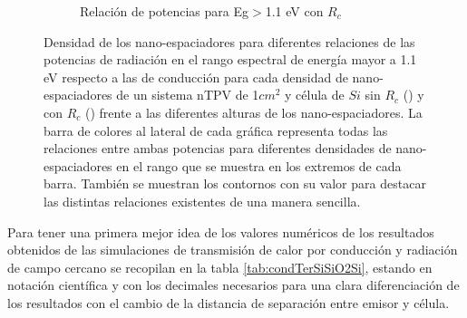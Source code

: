 \begin{figure}[H]
\begin{subfigure}[b]{0.49\textwidth}
	\caption{Relación de potencias para Eg$>$1.1 eV con $R_c$}
	\label{fig:rel_SiSi11_Rc}
\end{subfigure}
\caption{Densidad de los nano-espaciadores para diferentes relaciones de las potencias de radiación en el rango espectral de energía mayor a 1.1 eV respecto a las de conducción para cada densidad de nano-espaciadores de un sistema nTPV de 1$cm^2$ y célula de $Si$ sin $R_c$ () y con $R_c$ () frente a las diferentes alturas de los nano-espaciadores. La barra de colores al lateral de cada gráfica representa todas las relaciones entre ambas potencias para diferentes densidades de nano-espaciadores en el rango que se muestra en los extremos de cada barra. También se muestran los contornos con su valor para destacar las distintas relaciones existentes de una manera sencilla.}
	\label{fig:rels_SiSi11}
\end{figure}
Para tener una primera mejor idea de los valores numéricos de los resultados obtenidos de las simulaciones de transmisión de calor por conducción y radiación de campo cercano se recopilan en la tabla \ref{tab:condTerSiSiO2Si}, estando en notación científica y con los decimales necesarios para una clara diferenciación de los resultados con el cambio de la distancia de separación entre emisor y célula.
